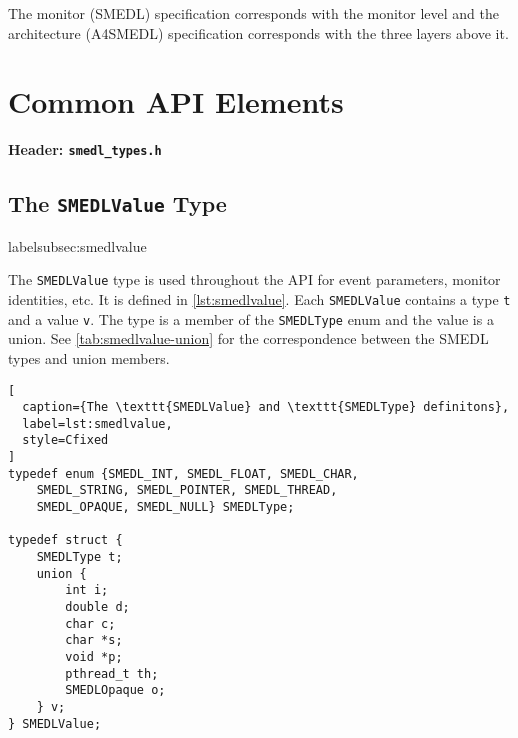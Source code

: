 \documentclass[paper=letter,titlepage,captions=tableheading]{scrartcl}
\begin{document}
The monitor (SMEDL) specification corresponds with the monitor level and the
architecture (A4SMEDL) specification corresponds with the three layers above
it.

\section{Common API Elements}
\label{sec:common}

\textbf{Header: \texttt{smedl\_types.h}}

\subsection{The \texttt{SMEDLValue} Type}
label{subsec:smedlvalue}

The \texttt{SMEDLValue} type is used throughout the API for event parameters,
monitor identities, etc. It is defined in \autoref{lst:smedlvalue}. Each 
\texttt{SMEDLValue} contains a type \texttt{t} and a value \texttt{v}. The type
is a member of the \texttt{SMEDLType} enum and the value is a union. See
\autoref{tab:smedlvalue-union} for the correspondence between the SMEDL types
and union members.

\begin{lstlisting}[
  caption={The \texttt{SMEDLValue} and \texttt{SMEDLType} definitons},
  label=lst:smedlvalue,
  style=Cfixed
]
typedef enum {SMEDL_INT, SMEDL_FLOAT, SMEDL_CHAR,
    SMEDL_STRING, SMEDL_POINTER, SMEDL_THREAD,
    SMEDL_OPAQUE, SMEDL_NULL} SMEDLType;

typedef struct {
    SMEDLType t;
    union {
        int i;
        double d;
        char c;
        char *s;
        void *p;
        pthread_t th;
        SMEDLOpaque o;
    } v;
} SMEDLValue;
\end{lstlisting}

\end{document}
